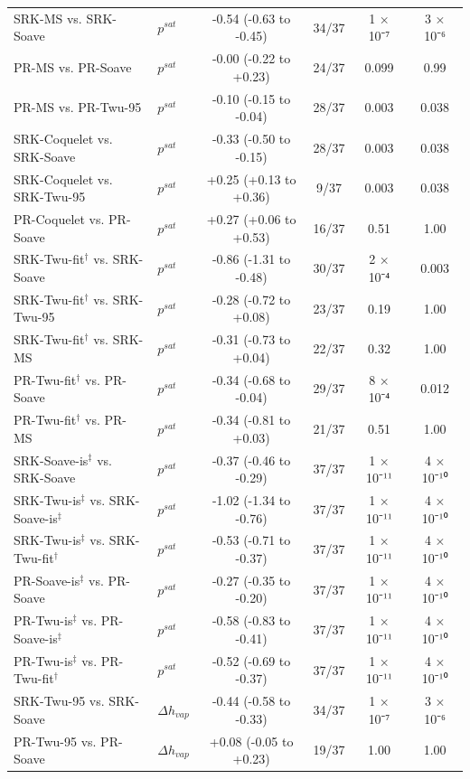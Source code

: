 \begin{table}[H]
\begin{tabular}{llcccc}
SRK-MS vs. SRK-Soave & $p^{sat}$ & -0.54 (-0.63 to -0.45) & 34/37 & 1 × 10⁻⁷ & 3 × 10⁻⁶ \\
PR-MS vs. PR-Soave & $p^{sat}$ & -0.00 (-0.22 to +0.23) & 24/37 & 0.099 & 0.99 \\
PR-MS vs. PR-Twu-95 & $p^{sat}$ & -0.10 (-0.15 to -0.04) & 28/37 & 0.003 & 0.038 \\
SRK-Coquelet vs. SRK-Soave & $p^{sat}$ & -0.33 (-0.50 to -0.15) & 28/37 & 0.003 & 0.038 \\
SRK-Coquelet vs. SRK-Twu-95 & $p^{sat}$ & +0.25 (+0.13 to +0.36) & 9/37 & 0.003 & 0.038 \\
PR-Coquelet vs. PR-Soave & $p^{sat}$ & +0.27 (+0.06 to +0.53) & 16/37 & 0.51 & 1.00 \\
SRK-Twu-fit$^{\dagger}$ vs. SRK-Soave & $p^{sat}$ & -0.86 (-1.31 to -0.48) & 30/37 & 2 × 10⁻⁴ & 0.003 \\
SRK-Twu-fit$^{\dagger}$ vs. SRK-Twu-95 & $p^{sat}$ & -0.28 (-0.72 to +0.08) & 23/37 & 0.19 & 1.00 \\
SRK-Twu-fit$^{\dagger}$ vs. SRK-MS & $p^{sat}$ & -0.31 (-0.73 to +0.04) & 22/37 & 0.32 & 1.00 \\
PR-Twu-fit$^{\dagger}$ vs. PR-Soave & $p^{sat}$ & -0.34 (-0.68 to -0.04) & 29/37 & 8 × 10⁻⁴ & 0.012 \\
PR-Twu-fit$^{\dagger}$ vs. PR-MS & $p^{sat}$ & -0.34 (-0.81 to +0.03) & 21/37 & 0.51 & 1.00 \\
SRK-Soave-is$^{\ddagger}$ vs. SRK-Soave & $p^{sat}$ & -0.37 (-0.46 to -0.29) & 37/37 & 1 × 10⁻¹¹ & 4 × 10⁻¹⁰ \\
SRK-Twu-is$^{\ddagger}$ vs. SRK-Soave-is$^{\ddagger}$ & $p^{sat}$ & -1.02 (-1.34 to -0.76) & 37/37 & 1 × 10⁻¹¹ & 4 × 10⁻¹⁰ \\
SRK-Twu-is$^{\ddagger}$ vs. SRK-Twu-fit$^{\dagger}$ & $p^{sat}$ & -0.53 (-0.71 to -0.37) & 37/37 & 1 × 10⁻¹¹ & 4 × 10⁻¹⁰ \\
PR-Soave-is$^{\ddagger}$ vs. PR-Soave & $p^{sat}$ & -0.27 (-0.35 to -0.20) & 37/37 & 1 × 10⁻¹¹ & 4 × 10⁻¹⁰ \\
PR-Twu-is$^{\ddagger}$ vs. PR-Soave-is$^{\ddagger}$ & $p^{sat}$ & -0.58 (-0.83 to -0.41) & 37/37 & 1 × 10⁻¹¹ & 4 × 10⁻¹⁰ \\
PR-Twu-is$^{\ddagger}$ vs. PR-Twu-fit$^{\dagger}$ & $p^{sat}$ & -0.52 (-0.69 to -0.37) & 37/37 & 1 × 10⁻¹¹ & 4 × 10⁻¹⁰ \\
SRK-Twu-95 vs. SRK-Soave & $\Delta h_{vap}$ & -0.44 (-0.58 to -0.33) & 34/37 & 1 × 10⁻⁷ & 3 × 10⁻⁶ \\
PR-Twu-95 vs. PR-Soave & $\Delta h_{vap}$ & +0.08 (-0.05 to +0.23) & 19/37 & 1.00 & 1.00 \\

\end{tabular}
\end{table}
